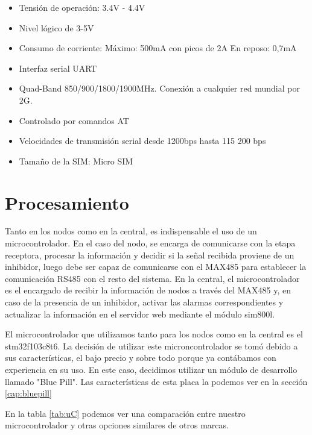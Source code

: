 \begin{itemize}
    \item Tensión de operación: 3.4V - 4.4V
    \item Nivel lógico de 3-5V
    \item Consumo de corriente:
    \subitem Máximo: 500mA con picos de 2A
    \subitem En reposo: 0,7mA
    \item Interfaz serial UART
    \item Quad-Band 850/900/1800/1900MHz. Conexión a cualquier red mundial por 2G.
    \item Controlado por comandos AT
    \item Velocidades de transmisión serial desde 1200bps hasta 115 200 bps
    \item Tamaño de la SIM: Micro SIM
\end{itemize}

\section{Procesamiento} \par

Tanto en los nodos como en la central, es indispensable el uso de un microcontrolador. En el caso del nodo, se encarga de comunicarse con la etapa receptora,
procesar la información y decidir si la señal recibida proviene de un inhibidor, luego debe ser capaz de comunicarse con el MAX485 para establecer la comunicación
RS485 con el resto del sistema. En la central, el microcontrolador es el encargado de recibir la información de nodos a través del MAX485 y,
en caso de la presencia de un inhibidor, activar las alarmas correspondientes y actualizar la información en el servidor web mediante el módulo sim800l. \par

El microcontrolador que utilizamos tanto para los nodos como en la central es el stm32f103c8t6. La decisión de utilizar este microncontrolador se tomó debido 
a sus características, el bajo precio y sobre todo porque ya contábamos con experiencia en su uso.
En este caso, decidimos utilizar un módulo de desarrollo llamado "Blue Pill". Las características de esta placa la podemos ver en la sección \ref{cap:bluepill}

En la tabla \ref{tab:uC} podemos ver una comparación entre nuestro microcontrolador y otras opciones similares de otros marcas.


